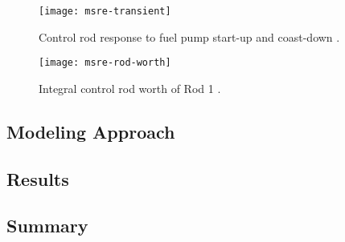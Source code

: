 \begin{figure}[htb]
  \centering
  \begin{minipage}[t]{0.49\textwidth}
    \centering
    \texttt{[image: msre-transient]}
    \caption{Control rod response to fuel pump start-up and coast-down
    \cite{prince_zero-power_1968}.}
    \label{fig:msre-pump-rod}
  \end{minipage}
  \hfill
  \begin{minipage}[t]{0.49\textwidth}
    \centering
    \texttt{[image: msre-rod-worth]}
    \caption{Integral control rod worth of Rod 1 \cite{prince_zero-power_1968}.}
    \label{fig:msre-rod-worth}
  \end{minipage}
\end{figure}


\subsection{Modeling Approach}

\subsection{Results}

\subsection{Summary}

\FloatBarrier
